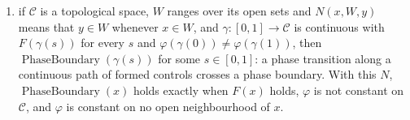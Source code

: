 \begin{theorem}
\begin{enumerate}[label=(\roman*)]
  \(\varphi(x_0)\ne\varphi(x_n)\), then some \(k<n\) has
  \(\varphi(x_k)\ne\varphi(x_{k+1})\) and
  \(\operatorname{PhaseBoundary}(x_k)\): a phase transition along a path of
  neighbouring formed controls crosses a phase boundary;
\item if \(\mathcal C\) is a topological space, \(W\) ranges over its open
  sets and \(N(x,W,y)\) means that \(y\in W\) whenever \(x\in W\), and
  \(\gamma:[0,1]\to\mathcal C\) is continuous with \(F(\gamma(s))\) for every
  \(s\) and \(\varphi(\gamma(0))\ne\varphi(\gamma(1))\), then
  \(\operatorname{PhaseBoundary}(\gamma(s))\) for some \(s\in[0,1]\): a phase
  transition along a continuous path of formed controls crosses a phase
  boundary. With this \(N\), \(\operatorname{PhaseBoundary}(x)\) holds exactly
  when \(F(x)\) holds, \(\varphi\) is not constant on \(\mathcal C\), and
  \(\varphi\) is constant on no open neighbourhood of \(x\).
\end{enumerate}
\end{theorem}
